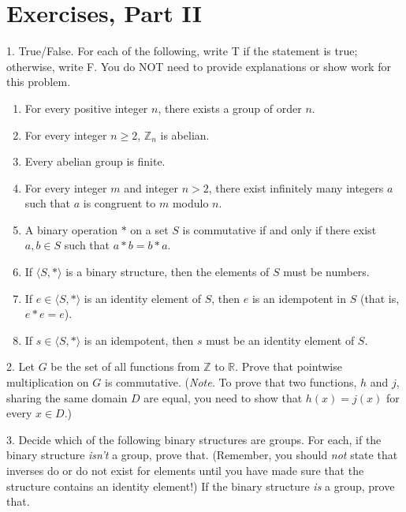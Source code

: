 \documentclass[10pt,]{book}
\theoremstyle{plain}
\theoremstyle{definition}
\theoremstyle{definition}
\theoremstyle{definition}
\theoremstyle{definition}
\numberwithin{equation}{section}
\def\Z{\mathbb{Z}}
\def\R{\mathbb{R}}
\begin{document}
\section[{Exercises, Part II}]{Exercises, Part II}\label{exercises-3}
\begin{exerciselist}
\item[1.]\hypertarget{exercise-12}{}True/False. For each of the following, write T if the statement is true; otherwise, write F. You do NOT need to provide explanations or show work for this problem. \leavevmode%
\begin{enumerate}[label=(\alph*)]
\item\hypertarget{li-89}{}For every positive integer \(n\), there exists a group of order \(n\).%
\item\hypertarget{li-90}{}For every integer \(n\geq 2\), \(\Z_n\) is abelian.%
\item\hypertarget{li-91}{}Every abelian group is finite.%
\item\hypertarget{li-92}{}For every integer \(m\) and integer \(n>2\), there exist infinitely many integers \(a\) such that \(a\) is congruent to \(m\) modulo \(n\).%
\item\hypertarget{li-93}{}A binary operation \(*\) on a set \(S\) is commutative if and only if there exist \(a,b\in S\) such that \(a*b=b*a\).%
\item\hypertarget{li-94}{}If \(\langle S, *\rangle\) is a binary structure, then the elements of \(S\) must be numbers.%
\item\hypertarget{li-95}{}If \(e\in \langle S,*\rangle\) is an identity element of \(S\), then \(e\) is an idempotent in \(S\) (that is, \(e*e=e\)).%
\item\hypertarget{li-96}{}If \(s\in \langle S,*\rangle\) is an idempotent, then \(s\) must be an identity element of \(S\).%
\end{enumerate}
%
\par\smallskip
\item[2.]\hypertarget{exercise-13}{}Let \(G\) be the set of all functions from \(\Z\) to \(\R\). Prove that pointwise multiplication on \(G\) is commutative. (\emph{Note.} To prove that two functions, \(h\) and \(j\), sharing the same domain \(D\) are equal, you need to show that \(h(x)=j(x)\) for every \(x\in D\).)%
\par\smallskip
\item[3.]\hypertarget{exercise-14}{}Decide which of the following binary structures are groups. For each, if the binary structure \emph{isn't} a group, prove that. (Remember, you should \emph{not} state that inverses do or do not exist for elements until you have made sure that the structure contains an identity element!) If the binary structure \emph{is} a group, prove that. \leavevmode%

\end{exerciselist}
\end{document}
